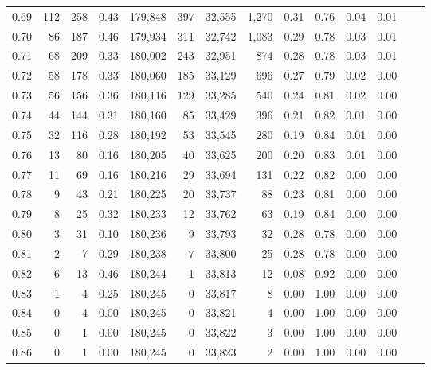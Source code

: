 \begin{tabular}{rrrrrrrrrrrrrr}
0.69 &    112 &  258 &    0.43 &  179,848 &      397 &  32,555 &   1,270 &  0.31 &  0.76 &  0.04 &      0.01 \\
0.70 &     86 &  187 &    0.46 &  179,934 &      311 &  32,742 &   1,083 &  0.29 &  0.78 &  0.03 &      0.01 \\
0.71 &     68 &  209 &    0.33 &  180,002 &      243 &  32,951 &     874 &  0.28 &  0.78 &  0.03 &      0.01 \\
0.72 &     58 &  178 &    0.33 &  180,060 &      185 &  33,129 &     696 &  0.27 &  0.79 &  0.02 &      0.00 \\
0.73 &     56 &  156 &    0.36 &  180,116 &      129 &  33,285 &     540 &  0.24 &  0.81 &  0.02 &      0.00 \\
0.74 &     44 &  144 &    0.31 &  180,160 &       85 &  33,429 &     396 &  0.21 &  0.82 &  0.01 &      0.00 \\
0.75 &     32 &  116 &    0.28 &  180,192 &       53 &  33,545 &     280 &  0.19 &  0.84 &  0.01 &      0.00 \\
0.76 &     13 &   80 &    0.16 &  180,205 &       40 &  33,625 &     200 &  0.20 &  0.83 &  0.01 &      0.00 \\
0.77 &     11 &   69 &    0.16 &  180,216 &       29 &  33,694 &     131 &  0.22 &  0.82 &  0.00 &      0.00 \\
0.78 &      9 &   43 &    0.21 &  180,225 &       20 &  33,737 &      88 &  0.23 &  0.81 &  0.00 &      0.00 \\
0.79 &      8 &   25 &    0.32 &  180,233 &       12 &  33,762 &      63 &  0.19 &  0.84 &  0.00 &      0.00 \\
0.80 &      3 &   31 &    0.10 &  180,236 &        9 &  33,793 &      32 &  0.28 &  0.78 &  0.00 &      0.00 \\
0.81 &      2 &    7 &    0.29 &  180,238 &        7 &  33,800 &      25 &  0.28 &  0.78 &  0.00 &      0.00 \\
0.82 &      6 &   13 &    0.46 &  180,244 &        1 &  33,813 &      12 &  0.08 &  0.92 &  0.00 &      0.00 \\
0.83 &      1 &    4 &    0.25 &  180,245 &        0 &  33,817 &       8 &  0.00 &  1.00 &  0.00 &      0.00 \\
0.84 &      0 &    4 &    0.00 &  180,245 &        0 &  33,821 &       4 &  0.00 &  1.00 &  0.00 &      0.00 \\
0.85 &      0 &    1 &    0.00 &  180,245 &        0 &  33,822 &       3 &  0.00 &  1.00 &  0.00 &      0.00 \\
0.86 &      0 &    1 &    0.00 &  180,245 &        0 &  33,823 &       2 &  0.00 &  1.00 &  0.00 &      0.00 \\

\end{tabular}

